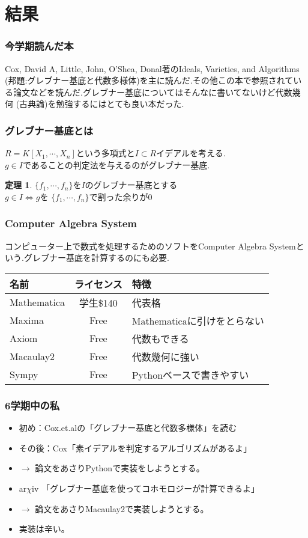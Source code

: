 \documentclass[dvipdfmx,22pt,notheorems]{beamer}
\theoremstyle{definition}
\newtheorem{theorem}{定理}
\begin{document}
\section{結果}
\begin{frame}
	\frametitle{今学期読んだ本}
	Cox, David A, Little, John, O'Shea, Donal著のIdeals, Varieties, and Algorithms
	(邦題:グレブナー基底と代数多様体)を主に読んだ.その他この本で参照されている論文などを読んだ.グレブナー基底についてはそんなに書いてないけど代数幾何  (古典論)を勉強するにはとても良い本だった.
\end{frame}
\begin{frame}
	\frametitle{グレブナー基底とは}
	$R=K[X_1,\cdots,X_n]$という多項式と$I \subset R$イデアルを考える.\\
	$g \in I$であることの判定法を与えるのがグレブナー基底.
	\begin{theorem}
	$\{ f_1, \cdots , f_n \}$を$I$のグレブナー基底とする\\
	$g \in I \Leftrightarrow g$を $\{f_1, \cdots , f_n \}$で割った余りが$0$\\
	\end{theorem}
\end{frame}
\begin{frame}
	\frametitle{Computer Algebra System}
	コンピューター上で数式を処理するためのソフトをComputer Algebra Systemという.グレブナー基底を計算するのにも必要.
	\begin{table}[htb]
  \begin{tabular}{|l|c|l|} \hline
    名前 & ライセンス & 特徴  \\ \hline 
    Mathematica & 学生\$140 & 代表格 \\
    Maxima & Free & Mathematicaに引けをとらない\\
	Axiom & Free & 代数もできる\\
	Macaulay2 & Free & 代数幾何に強い\\
	Sympy & Free & Pythonベースで書きやすい\\ \hline
  \end{tabular}
\end{table}
\end{frame}
\begin{frame}
	\frametitle{6学期中の私}
		\begin{itemize}
			\item \large 初め：Cox.et.alの「グレブナー基底と代数多様体」を読む\pause
			\item \large その後：Cox「素イデアルを判定するアルゴリズムがあるよ」\pause
			\item \large $\to$ 論文をあさりPythonで実装をしようとする。\pause
			\item \large ar$\chi$iv 「グレブナー基底を使ってコホモロジーが計算できるよ」\pause
			\item \large$\to$ 論文をあさりMacaulay2で実装しようとする。\pause
			\item \Huge 実装は辛い。
		\end{itemize}
\end{frame}
\end{document}
